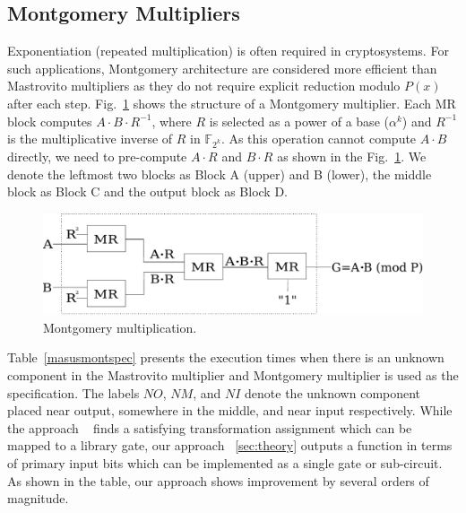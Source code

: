 \subsection{Montgomery Multipliers}
Exponentiation (repeated multiplication) is often required in cryptosystems.  
For such applications, Montgomery architecture \cite{acar:1998} \cite{wu:2002}
\cite{knezevic:2008} are considered more efficient than Mastrovito multipliers
as they do not require explicit reduction modulo $P(x)$ after each step.
Fig.~\ref{montfig} shows the structure of a Montgomery
multiplier. Each MR block computes $A\cdot B\cdot R^{-1}$, where $R$
is selected as a power of a base ($\alpha^{k}$) and $R^{-1}$ is the multiplicative 
inverse of $R$ in $\mathbb{F}_{2^k}$. As this operation cannot compute $A\cdot B$
directly, we need to pre-compute $A\cdot R$ and $B\cdot R$ as shown in the Fig.~\ref{montfig}. 
We denote the leftmost
two blocks as Block A (upper) and B (lower), the middle block as Block
C and the output block as Block D.

\begin{figure}[H]
  \centering
  \includegraphics[scale=0.34]{new_mmcircuit-eps-converted-to}
  \caption{Montgomery multiplication.}
  \label{montfig}
  \end{figure}
\vspace{-0.05in}

Table~\ref{masusmontspec} presents the execution times when there is an unknown component in the Mastrovito multiplier and Montgomery multiplier is used as the specification. The labels $NO$, $NM$, and $NI$ denote the unknown component placed near output, somewhere in the middle, and near input respectively. While the approach ~\cite{fujita:2015} finds a satisfying transformation assignment which can be mapped to a library gate, our approach ~\ref{sec:theory} outputs a function in terms of primary input bits which can be implemented as a single gate or sub-circuit. As shown in the table, our approach shows improvement by several orders of magnitude.

